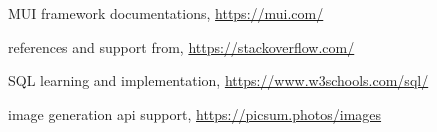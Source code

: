 \begin{thebibliography}{99}
	 MUI framework documentations, \url{https://mui.com/}
	
	 references and support from, \url{https://stackoverflow.com/} 
	
	 SQL learning and implementation, \url{https://www.w3schools.com/sql/}
	
	 image generation api support, \url{https://picsum.photos/images}
	

\end{thebibliography}
